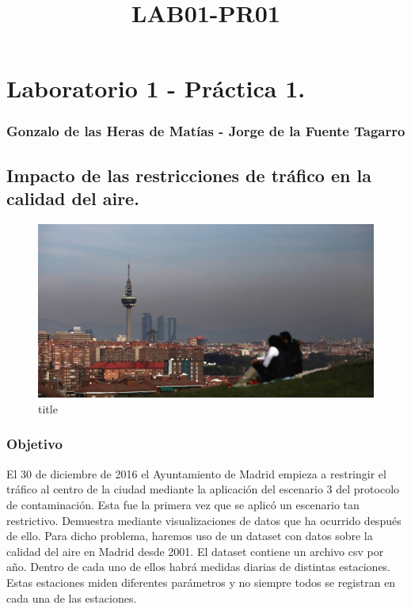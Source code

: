 \documentclass[11pt]{article}
\title{LAB01-PR01}
\makeatletter
\def\maxwidth{\ifdim\Gin@nat@width>\linewidth\linewidth
    \else\Gin@nat@width\fi}
\let\Oldincludegraphics\includegraphics
\renewcommand{\includegraphics}[1]{\Oldincludegraphics[width=.8\maxwidth]{#1}}
\makeatother
\begin{document}
    
    
    \maketitle
    
    

    
    \section{Laboratorio 1 - Práctica
1.}\label{laboratorio-1---pruxe1ctica-1.}

\subsubsection{Gonzalo de las Heras de Matías - Jorge de la Fuente
Tagarro}\label{gonzalo-de-las-heras-de-matuxedas---jorge-de-la-fuente-tagarro}

\subsection{Impacto de las restricciones de tráfico en la calidad del
aire.}\label{impacto-de-las-restricciones-de-truxe1fico-en-la-calidad-del-aire.}

\begin{figure}
\centering
\includegraphics{Images/madrid.jpg}
\caption{title}
\end{figure}

\subsubsection{Objetivo}\label{objetivo}

El 30 de diciembre de 2016 el Ayuntamiento de Madrid empieza a
restringir el tráfico al centro de la ciudad mediante la aplicación del
escenario 3 del protocolo de contaminación. Esta fue la primera vez que
se aplicó un escenario tan restrictivo. Demuestra mediante
visualizaciones de datos que ha ocurrido después de ello. Para dicho
problema, haremos uso de un dataset con datos sobre la calidad del aire
en Madrid desde 2001. El dataset contiene un archivo csv por año. Dentro
de cada uno de ellos habrá medidas diarias de distintas estaciones.
Estas estaciones miden diferentes parámetros y no siempre todos se
registran en cada una de las estaciones.
\end{document}
